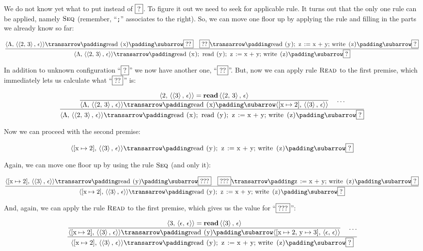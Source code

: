 We do not know yet what to put instead of $\fbox{?}$. To figure it out we need to seek for applicable rule. It turns
out that the only one rule can be applied, namely $\textsc{Seq}$ (remember, ``\lstinline|;|'' associates to
the right). So, we can move one floor up by applying the rule and filling in the parts we already know
so far:

\[
\trule{\trans{\inbr{\Lambda,\,\inbr{\inbr{2,\,3},\,\epsilon}}}{\llang{read (x)}}{\fbox{??}}\quad\trans{\fbox{??}}{\llang{read (y); z := x + y; write (z)}}{\fbox{?}}}
      {\trans{\inbr{\Lambda,\,\inbr{\inbr{2,\,3},\,\epsilon}}}{\llang{read (x); read (y); z := x + y; write (z)}}{\fbox{?}}}
\]

In addition to unknown configuration ``$\fbox{?}$'' we now have another one, ``$\fbox{??}$''. But, now we can apply rule $\textsc{Read}$ to the
first premise, which immediately lets us calculate what ``$\fbox{??}$'' is:

\[
\trule{\trule{\inbr{2,\,\inbr{\inbr{3},\,\epsilon}}=\primi{read}{\,\inbr{\inbr{2,\,3},\,\epsilon}}}
             {\trans{\inbr{\Lambda,\,\inbr{\inbr{2,\,3},\,\epsilon}}}{\llang{read (x)}}{\inbr{[\llang{x}\mapsto 2],\,\inbr{\inbr{3},\,\epsilon}}}}\quad
       \dots}
      {\trans{\inbr{\Lambda,\,\inbr{\inbr{2,\,3},\,\epsilon}}}{\llang{read (x); read (y); z := x + y; write (z)}}{\fbox{?}}}
\]

Now we can proceed with the second premise:

\[
\trans{\inbr{[\llang{x}\mapsto 2],\,\inbr{\inbr{3},\,\epsilon}}}{\llang{read (y); z := x + y; write (z)}}{\fbox{?}}
\]

Again, we can move one floor up by using the rule $\textsc{Seq}$ (and only it):

\[
\trule{\trans{\inbr{[\llang{x}\mapsto 2],\,\inbr{\inbr{3},\,\epsilon}}}{\llang{read (y)}}{\fbox{???}}\quad\trans{\fbox{???}}{\llang{z := x + y; write (z)}}{\fbox{?}}}
      {\trans{\inbr{[\llang{x}\mapsto 2],\,\inbr{\inbr{3},\,\epsilon}}}{\llang{read (y); z := x + y; write (z)}}{\fbox{?}}}
\]

And, again, we can apply the rule $\textsc{Read}$ to the first premise, which gives us the value for ``$\fbox{???}$'':

\[
\trule{\trule{\inbr{3,\,\inbr{\epsilon,\,\epsilon}}=\primi{read}{\,\inbr{\inbr{3},\,\epsilon}}}
             {\trans{\inbr{[\llang{x}\mapsto 2],\,\inbr{\inbr{3},\,\epsilon}}}{\llang{read (y)}}{\inbr{[\llang{x}\mapsto 2,\,\llang{y}\mapsto 3],\,\inbr{\epsilon,\,\epsilon}}}}\quad
       \dots}
      {\trans{\inbr{[\llang{x}\mapsto 2],\,\inbr{\inbr{3},\,\epsilon}}}{\llang{read (y); z := x + y; write (z)}}{\fbox{?}}}
\]

